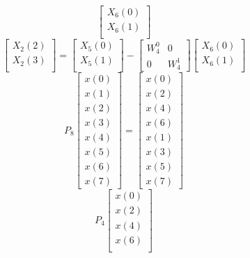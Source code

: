 \documentclass[journal,12pt,twocolumn]{IEEEtran}
\renewcommand\thesection{\arabic{section}}
\begin{document}
\begin{enumerate}[label=\thesection.\arabic*]
\begin{equation}
\begin{bmatrix}
		X_{6}(0) \\ 
		X_{6}(1) \\ 
	\end{bmatrix}
	\label{eq:4-2-high}
\end{equation}
\begin{equation}
	\begin{bmatrix}
		X_{2}(2) \\ 
		X_{2}(3)\\ 
	\end{bmatrix}
	=
	\begin{bmatrix}
		X_{5}(0) \\ 
		X_{5}(1)\\ 
	\end{bmatrix}
	-
	\begin{bmatrix}
		W^{0}_{4} & 0\\
		0 & W^{1}_{4}
	\end{bmatrix}
	\begin{bmatrix}
		X_{6}(0) \\ 
		X_{6}(1) \\ 
	\end{bmatrix}
	\label{eq:4-2-low}
\end{equation}
\begin{equation}
	P_{8}
	\begin{bmatrix}
		x(0) \\ 
		x(1) \\ 
		x(2) \\ 
		x(3) \\ 
		x(4) \\ 
		x(5) \\
		x(6) \\
		x(7)
	\end{bmatrix}
	= 
	\begin{bmatrix}
		x(0) \\ 
		x(2) \\ 
		x(4) \\ 
		x(6) \\
		x(1) \\ 
		x(3) \\ 
		x(5) \\
		x(7)
	\end{bmatrix}
\end{equation}
\begin{equation}
	P_{4}
	\begin{bmatrix}
		x(0) \\ 
		x(2) \\ 
		x(4) \\ 
		x(6) \\

\end{bmatrix}
\end{equation}
\end{enumerate}
\end{document}
